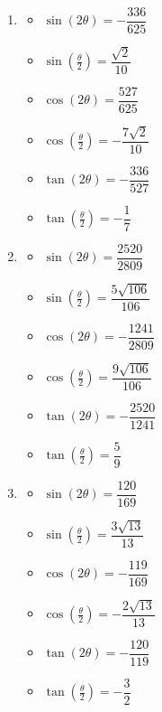 \begin{enumerate}

\setcounter{enumi}{\value{HW}}

\item \begin{multicols}{3}

\begin{itemize}

\item $\sin(2\theta) = -\dfrac{336}{625}$
\item $\sin\left(\frac{\theta}{2}\right) = \dfrac{\sqrt{2}}{10}$
\item $\cos(2\theta) = \dfrac{527}{625}$
\item $\cos\left(\frac{\theta}{2}\right) = -\dfrac{7\sqrt{2}}{10}$
\item $\tan(2\theta) = -\dfrac{336}{527}$
\item $\tan\left(\frac{\theta}{2}\right) = -\dfrac{1}{7}$

\end{itemize}

\end{multicols}

\item \begin{multicols}{3}

\begin{itemize}

\item $\sin(2\theta) = \dfrac{2520}{2809}$
\item $\sin\left(\frac{\theta}{2}\right) = \dfrac{5\sqrt{106}}{106}$
\item $\cos(2\theta) = -\dfrac{1241}{2809}$
\item $\cos\left(\frac{\theta}{2}\right) = \dfrac{9\sqrt{106}}{106}$
\item $\tan(2\theta) = -\dfrac{2520}{1241}$
\item $\tan\left(\frac{\theta}{2}\right) = \dfrac{5}{9}$

\end{itemize}

\end{multicols}

\item \begin{multicols}{3}

\begin{itemize}

\item $\sin(2\theta) = \dfrac{120}{169}$
\item $\sin\left(\frac{\theta}{2}\right) = \dfrac{3\sqrt{13}}{13}$
\item $\cos(2\theta) = -\dfrac{119}{169}$
\item $\cos\left(\frac{\theta}{2}\right) = -\dfrac{2\sqrt{13}}{13}$
\item $\tan(2\theta) = -\dfrac{120}{119}$
\item $\tan\left(\frac{\theta}{2}\right) = -\dfrac{3}{2}$


\end{itemize}
\end{multicols}
\end{enumerate}
